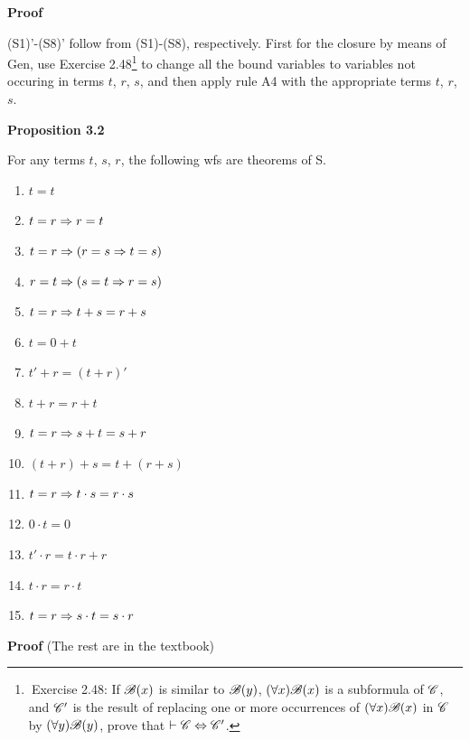 \textbf{Proof}

(S1)'-(S8)' follow from (S1)-(S8), respectively. First for the closure by means of Gen, use Exercise 2.48\footnote{$\ $Exercise 2.48: If $\mathscr{B}(x)$ is similar to $\mathscr{B}(y)$, $(\forall x)\mathscr{B}(x)$ is a subformula of $\mathscr{C}$, and $\mathscr{C}'$ is the result of replacing one or more occurrences of $(\forall x)\mathscr{B}(x)$ in $\mathscr{C}$ by $(\forall y)\mathscr{B}(y)$, prove that $\vdash \mathscr{C} \Leftrightarrow \mathscr{C}'$.} to change all the bound variables to variables not occuring in terms $t$, $r$, $s$, and then apply rule A4 with the appropriate terms $t$, $r$, $s$.

\textbf{Proposition 3.2}

For any terms $t$, $s$, $r$, the following wfs are theorems of S.

\begin{enumerate} [label=\alph*.]
    \item $t=t$
    \item $t=r \Rightarrow r=t$
    \item $t=r \Rightarrow (r=s \Rightarrow t=s)$
    \item $r=t \Rightarrow (s=t \Rightarrow r=s)$
    \item $t=r \Rightarrow t+s = r+s$
    \item $t=0+t$
    \item $t'+r=(t+r)'$
    \item $t+r=r+t$
    \item $t=r \Rightarrow s+t=s+r$
    \item $(t+r)+s=t+(r+s)$
    \item $t=r \Rightarrow t\cdot s = r \cdot s$
    \item $0 \cdot t = 0$
    \item $t' \cdot r = t\cdot r + r$
    \item $t \cdot r = r \cdot t$
    \item $t=r \Rightarrow s \cdot t= s \cdot r$
\end{enumerate}

\textbf{Proof} (The rest are in the textbook)

